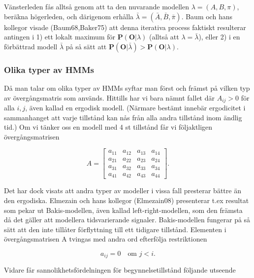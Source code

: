 \documentclass[../rapport_MVEX01-11-05]{subfiles}
\begin{document}
Vänsterleden fås alltså genom att ta den nuvarande modellen $\lambda =
(A,B,\pi)$, beräkna högerleden, och därigenom erhålla $\bar{\lambda} =
(\bar{A},\bar{B}, \bar{\pi})$. Baum och hans kollegor visade
(Baum68,Baker75) att denna iterativa process faktiskt resulterar
antingen i 1) ett lokalt maximum för $\textbf{P}(\textbf{O}|\lambda)$
(alltså att $\lambda = \bar{\lambda}$), eller 2) i en förbättrad
modell $\bar{\lambda}$ på så sätt att
$\textbf{P}(\textbf{O}|\bar{\lambda}) > \textbf{P}(\textbf{O}|\lambda)$. 

\subsubsection{Olika typer av HMMs}

Då man talar om olika typer av HMMs syftar man först och främst på
vilken typ av övergångsmatris som används. Hittills har vi bara nämnt
fallet där $A_{ij} > 0$ för alla $i,j$, även kallad en ergodisk
modell. (Närmare bestämt innebär ergodicitet i sammanhanget att varje
tillstånd kan nås från alla andra tillstånd inom ändlig tid.) Om vi
tänker oss en modell med 4 st tillstånd får vi följaktligen övergångsmatrisen

\begin{equation*}
A = \begin{bmatrix}
a_{11} & a_{12} & a_{13} & a_{14}\\
a_{21} & a_{22} & a_{23} & a_{24}\\
a_{31} & a_{32} & a_{33} & a_{34}\\
a_{41} & a_{42} & a_{43} & a_{44}
\end{bmatrix}.  
\end{equation*} 

Det har dock visats att andra typer av modeller i vissa fall presterar
bättre än den ergodiska. Elmezain och hans kollegor (Elmezain08)
presenterar t.ex resultat som pekar ut Bakis-modellen, även kallad
left-right-modellen, som den främsta då det gäller att modellera
tidsvarierande signaler. Bakis-modellen fungerar på så sätt att den
inte tillåter förflyttning till ett tidigare tillstånd. Elementen i
övergångsmatrisen A tvingas med andra ord efterfölja restriktionen

\begin{equation*}
a_{ij} = 0 \quad\text{om }j<i.
\end{equation*}

Vidare får sannolikhetsfördelningen för begynnelsetillstånd följande
utseende
\end{document}
